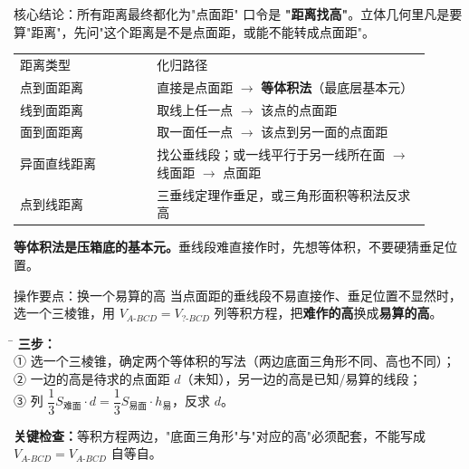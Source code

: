 \documentclass{exam-zh}
\begin{document}
\begin{eduSolutionBox}{核心结论：所有距离最终都化为"点面距"}
  \begingroup
  \setlength{\parskip}{2.5mm}
口令是 \textbf{"距离找高"}。立体几何里凡是要算"距离"，先问"这个距离是不是点面距，或能不能转成点面距"。\par
\begin{tabular}{p{0.30\linewidth}p{0.60\linewidth}}
距离类型 & 化归路径\\
点到面距离 & 直接是点面距 $\to$ \textbf{等体积法}（最底层基本元）\\
线到面距离 & 取线上任一点 $\to$ 该点的点面距\\
面到面距离 & 取一面任一点 $\to$ 该点到另一面的点面距\\
异面直线距离 & 找公垂线段；或一线平行于另一线所在面 $\to$ 线面距 $\to$ 点面距\\
点到线距离 & 三垂线定理作垂足，或三角形面积等积法反求高
\end{tabular}
\par
\textbf{等体积法是压箱底的基本元。}垂线段难直接作时，先想等体积，不要硬猜垂足位置。\par
  \endgroup
\end{eduSolutionBox}



\clearpage
{}


\begin{eduSolutionBox}{操作要点：换一个易算的高}
  \begingroup
  \setlength{\parskip}{2.5mm}
当点面距的垂线段不易直接作、垂足位置不显然时，选一个三棱锥，用 $V_{A\text{-}BCD}=V_{?\text{-}BCD}$ 列等积方程，把\textbf{难作的高}换成\textbf{易算的高}。\par
\begin{tabbing}
\hspace{2em}\=\kill
\textbf{三步：}\\
\>① 选一个三棱锥，确定两个等体积的写法（两边底面三角形不同、高也不同）；\\
\>② 一边的高是待求的点面距 $d$（未知），另一边的高是已知/易算的线段；\\
\>③ 列 $\dfrac13 S_{\text{难面}}\cdot d=\dfrac13 S_{\text{易面}}\cdot h_{\text{易}}$，反求 $d$。
\end{tabbing}
\par
\textbf{关键检查：}等积方程两边，"底面三角形"与"对应的高"必须配套，不能写成 $V_{A\text{-}BCD}=V_{A\text{-}BCD}$ 自等自。\par
  \endgroup
\end{eduSolutionBox}
\end{document}
